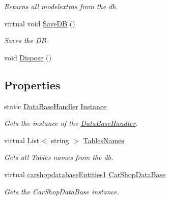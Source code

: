 \begin{DoxyCompactItemize}
\begin{DoxyCompactList}\small\item\em Returns all modelextras from the db. \end{DoxyCompactList}\item 
virtual void \mbox{\hyperlink{class_car_shop_1_1_data_1_1_data_base_handler_abe88f4775a028dfdc5231262ee99f8f5}{Save\+DB}} ()
\begin{DoxyCompactList}\small\item\em Saves the DB. \end{DoxyCompactList}\item 
\mbox{\label{class_car_shop_1_1_data_1_1_data_base_handler_a88288d20c2c3852b7aa0ebb234418483}} 
void \mbox{\hyperlink{class_car_shop_1_1_data_1_1_data_base_handler_a88288d20c2c3852b7aa0ebb234418483}{Dispose}} ()
\end{DoxyCompactItemize}
\subsection*{Properties}
\begin{DoxyCompactItemize}
\item 
static \mbox{\hyperlink{class_car_shop_1_1_data_1_1_data_base_handler}{Data\+Base\+Handler}} \mbox{\hyperlink{class_car_shop_1_1_data_1_1_data_base_handler_a25f9fd5f7b7ea4f7a87eecfccf894d4a}{Instance}}
\begin{DoxyCompactList}\small\item\em Gets the instance of the \mbox{\hyperlink{class_car_shop_1_1_data_1_1_data_base_handler}{Data\+Base\+Handler}}. \end{DoxyCompactList}\item 
virtual List$<$ string $>$ \mbox{\hyperlink{class_car_shop_1_1_data_1_1_data_base_handler_a4af389005c2397df7a5fa9bfa8a7efef}{Tables\+Names}}
\begin{DoxyCompactList}\small\item\em Gets all Table\textquotesingle{}s names from the db. \end{DoxyCompactList}\item 
virtual \mbox{\hyperlink{class_car_shop_1_1_data_1_1carshopdatabase_entities1}{carshopdatabase\+Entities1}} \mbox{\hyperlink{class_car_shop_1_1_data_1_1_data_base_handler_a512a99c830f8ade3a7cc5a36aa490784}{Car\+Shop\+Data\+Base}}
\begin{DoxyCompactList}\small\item\em Gets the Car\+Shop\+Data\+Base instance. \end{DoxyCompactList}\end{DoxyCompactItemize}


